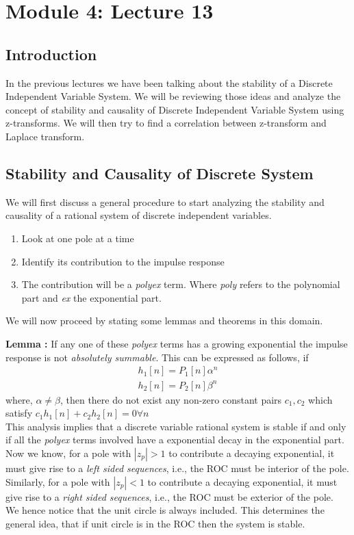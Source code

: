 \section{Module 4: Lecture 13\\}

\subsection{Introduction}
In the previous lectures we have been talking about the stability of a Discrete Independent Variable System. We will be reviewing those ideas and analyze the concept of stability and causality of  
Discrete Independent Variable System using z-transforms.
We will then try to find a correlation between z-transform and Laplace transform.
\subsection{Stability and Causality of Discrete System}
 We will first discuss a general procedure to start analyzing the stability and causality of a rational system of discrete independent variables.
\begin{enumerate}
\item Look at one pole at a time
\item Identify its contribution to the impulse response
\item The contribution will be a \textit{polyex} term. Where \textit{poly} refers to the polynomial part and \textit{ex} the exponential part.
\end{enumerate}

We will now proceed by stating some lemmas and theorems in this domain.

\textbf{Lemma : } If any one of these \textit{polyex} terms has a growing exponential the impulse response is not \textit{absolutely summable}.  This can be expressed as follows, if
\begin{align*}
h_1[n] = P_1[n]\alpha^n \\
h_2[n] = P_2[n]\beta^n
\end{align*}
where, $\alpha \neq \beta$, then there do not exist any non-zero constant pairs $c_1,c_2$ which satisfy 
$c_1h_1[n] + c_2h_2[n] = 0 \forall n$\\
This analysis implies that a discrete variable rational system is stable if and only if all the \textit{polyex} terms involved have a exponential decay in the exponential part.\\
Now we know, for a pole with $|z_p| > 1$ to contribute a decaying exponential, it must  give rise to a \textit{left sided sequences}, i.e., the ROC must be interior of the pole. Similarly, for a pole with $|z_p| < 1 $ to contribute a decaying exponential, it must  give rise to a \textit{right sided sequences}, i.e., the ROC must be exterior of the pole.\\
We hence notice that the unit circle is always included. This determines the general idea, that if unit circle is in the ROC then the system is stable.

